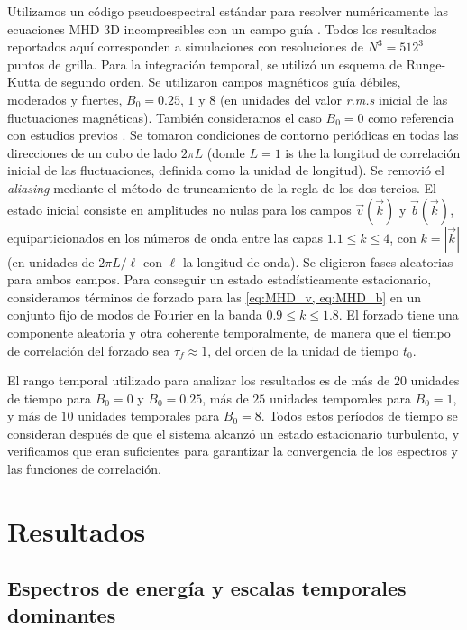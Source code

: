 Utilizamos un código pseudoespectral estándar para resolver
numéricamente las ecuaciones MHD 3D incompresibles con un campo guía
\cite{gomez_parallel_2005, gomez_mhd_2005}. Todos los resultados
reportados aquí corresponden a simulaciones con resoluciones de $N^3 =
512^3$ puntos de grilla. Para la integración temporal, se utilizó un
esquema de Runge-Kutta de segundo orden. Se utilizaron campos
magnéticos guía débiles, moderados y fuertes, $B_0 = 0.25$, $1$ y $8$
(en unidades del valor \textit{r.m.s} inicial de las fluctuaciones
magnéticas). También consideramos el caso $B_0 = 0$ como referencia
con estudios previos \cite{servidio_time_2011}. Se tomaron condiciones
de contorno periódicas en todas las direcciones de un cubo de lado
$2\pi L$ (donde $L = 1$ is the la longitud de correlación inicial de
las fluctuaciones, definida como la unidad de longitud).  Se removió
el \textit{aliasing} mediante el método de truncamiento de la regla de
los dos-tercios. El estado inicial consiste en amplitudes no nulas
para los campos $\vec{v}(\vec{k})$ y $\vec{b}(\vec{k})$,
equiparticionados en los números de onda entre las capas $1.1\leq k
\leq 4$, con $k=|\vec{k}|$ (en unidades de $2\pi L/\ell$ con $\ell$ la
longitud de onda). Se eligieron fases aleatorias para ambos campos.
Para conseguir un estado estadísticamente estacionario, consideramos
términos de forzado para las \cref{eq:MHD_v, eq:MHD_b} en un conjunto
fijo de modos de Fourier en la banda $0.9\leq k \leq 1.8$. El forzado
tiene una componente aleatoria y otra coherente temporalmente, de
manera que el tiempo de correlación del forzado sea $\tau_f \approx
1$, del orden de la unidad de tiempo $t_0$.

El rango temporal utilizado para analizar los resultados es de más de
$20$ unidades de tiempo para $B_0=0$ y $B_0=0.25$, más de $25$
unidades temporales para $B_0=1$, y más de $10$ unidades temporales
para $B_0=8$. Todos estos períodos de tiempo se consideran después de
que el sistema alcanzó un estado estacionario turbulento, y
verificamos que eran suficientes para garantizar la convergencia de
los espectros y las funciones de correlación.


\section{Resultados}\label{sec_Res}

\subsection{Espectros de energía y escalas temporales dominantes}

